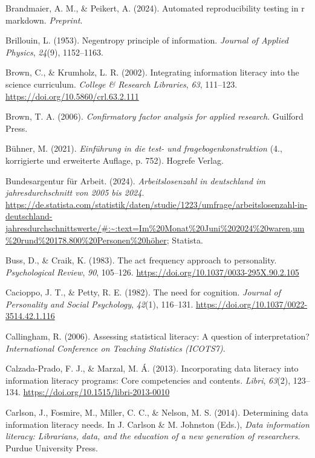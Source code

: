 \documentclass[
  12pt,
  a4paper,
  twoside]{article}
\newlength{\cslhangindent}
\newenvironment{CSLReferences}[2] %
 {\begin{list}{}{%
  \setlength{\itemindent}{0pt}
  \setlength{\leftmargin}{0pt}
  \setlength{\parsep}{0pt}
  \ifodd #1
   \setlength{\leftmargin}{\cslhangindent}
   \setlength{\itemindent}{-1\cslhangindent}
  \fi
  \setlength{\itemsep}{#2\baselineskip}}}
 {\end{list}}
\begin{document}
\begin{CSLReferences}{1}{0}
Brandmaier, A. M., \& Peikert, A. (2024). Automated reproducibility testing in r markdown. \emph{Preprint}.

Brillouin, L. (1953). Negentropy principle of information. \emph{Journal of Applied Physics}, \emph{24}(9), 1152--1163.

Brown, C., \& Krumholz, L. R. (2002). Integrating information literacy into the science curriculum. \emph{College \& Research Libraries}, \emph{63}, 111--123. \url{https://doi.org/10.5860/crl.63.2.111}

Brown, T. A. (2006). \emph{Confirmatory factor analysis for applied research}. Guilford Press.

Bühner, M. (2021). \emph{Einführung in die test- und fragebogenkonstruktion} (4., korrigierte und erweiterte Auflage, p. 752). Hogrefe Verlag.

Bundesargentur für Arbeit. (2024). \emph{Arbeitslosenzahl in deutschland im jahresdurchschnitt von 2005 bis 2024}. \url{https://de.statista.com/statistik/daten/studie/1223/umfrage/arbeitslosenzahl-in-deutschland-jahresdurchschnittswerte/\#:~:text=Im\%20Monat\%20Juni\%202024\%20waren,um\%20rund\%20178.800\%20Personen\%20höher}; Statista.

Buss, D., \& Craik, K. (1983). The act frequency approach to personality. \emph{Psychological Review}, \emph{90}, 105--126. \url{https://doi.org/10.1037/0033-295X.90.2.105}

Cacioppo, J. T., \& Petty, R. E. (1982). The need for cognition. \emph{Journal of Personality and Social Psychology}, \emph{42}(1), 116--131. \url{https://doi.org/10.1037/0022-3514.42.1.116}

Callingham, R. (2006). Assessing statistical literacy: A question of interpretation? \emph{International Conference on Teaching Statistics (ICOTS7)}.

Calzada-Prado, F. J., \& Marzal, M. Á. (2013). Incorporating data literacy into information literacy programs: Core competencies and contents. \emph{Libri}, \emph{63}(2), 123--134. \url{https://doi.org/10.1515/libri-2013-0010}

Carlson, J., Fosmire, M., Miller, C. C., \& Nelson, M. S. (2014). Determining data information literacy needs. In J. Carlson \& M. Johnston (Eds.), \emph{Data information literacy: Librarians, data, and the education of a new generation of researchers}. Purdue University Press.


\end{CSLReferences}
\end{document}
